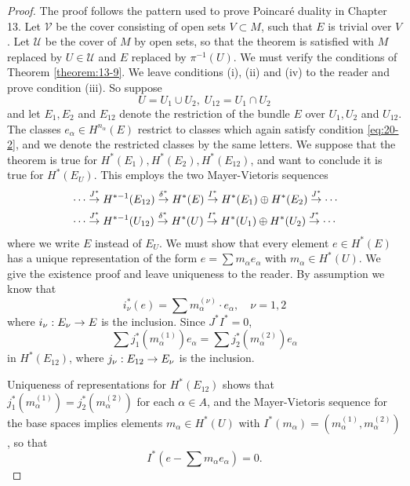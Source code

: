 \begin{proof}
  The proof follows the pattern used to prove Poincaré duality in Chapter 13. Let $\mathcal{V}$ be the cover 
  consisting of open sets $V \subset  M$, such that $E$ is trivial over $V$. Let $\mathcal{U}$ be the 
  cover of $M$ by open sets, so that the theorem is satisfied with $M$ replaced by $U \in  \mathcal{U}$ and $E$ 
  replaced by ${\pi }^{-1}( U)$. We must verify the conditions of Theorem \ref{theorem:13-9}. We leave conditions (i), (ii) 
  and (iv) to the reader and prove condition (iii). So suppose
  \[
    U = {U}_{1} \cup  {U}_{2},\;{U}_{12} = {U}_{1} \cap  {U}_{2}
  \]
  and let ${E}_{1},{E}_{2}$ and $E_{12}$ denote the restriction of the bundle $E$ over ${U}_{1},{U}_{2}$ 
  and ${U}_{12}$. The classes ${e}_{\alpha } \in  H^{{n}_{\alpha }}( E)$ restrict to classes which again 
  satisfy condition \eqref{eq:20-2}, and we denote the restricted classes by the same letters. We suppose that the theorem 
  is true for $H^*( {E}_{1}),H^*( {E}_{2}),H^*( E_{12})$, and want to conclude it is 
  true for $H^*( {E}_{U})$. This employs the two Mayer-Vietoris sequences
  \begin{align*}
    & \cdots \overset{{J}^*}
      { \rightarrow  }H^{*- 1}( E_{12}) \overset{{\delta }^*}
      { \rightarrow  }H^*( E) \overset{{I}^*}
      { \rightarrow  }H^*( {E}_{1})  \oplus  H^*( {E}_{2}) \overset{{J}^*}
      { \rightarrow  }\cdots\\
    & \cdots \overset{{J}^*}
      { \rightarrow  }H^{*- 1}( {U}_{12}) \overset{{\delta }^*}
      { \rightarrow  }H^*( U) \overset{{I}^*}
      { \rightarrow  }H^*( {U}_{1})  \oplus  H^*( {U}_{2}) \overset{{J}^*}
      { \rightarrow  }\cdots
  \end{align*}
  where we write $E$ instead of ${E}_{U}$. We must show that every element $e \in  H^*( E)$ has a unique 
  representation of the form $e = \sum {m}_{\alpha }{e}_{\alpha }$ with ${m}_{\alpha } \in  H^*( U)$. 
  We give the existence proof and leave uniqueness to the reader. By assumption we know that
  \[
    {i}_{\nu }^*( e)  = \sum {m}_{\alpha }^{( \nu ) } \cdot  {e}_{\alpha },\quad\nu  = 1,2
  \]
  where ${i}_{\nu } : {E}_{\nu } \rightarrow  E$ is the inclusion. Since ${J}^*{I}^* = 0$,
  \[
    \sum {j}_{1}^*( {m}_{\alpha }^{( 1) }) {e}_{\alpha } 
    = \sum {j}_{2}^*( {m}_{\alpha }^{( 2) }) {e}_{\alpha }
  \]
  in $H^*( E_{12})$, where ${j}_{\nu } : E_{12} \rightarrow  {E}_{\nu }$ is the inclusion.

  Uniqueness of representations for $H^*(E_{12})$ shows that ${j}_{1}^*( {m}_{\alpha }^{( 1) })= {j}_{2}^*( {m}_{\alpha }^{( 2) })$ 
  for each $\alpha  \in  A$, and the Mayer-Vietoris sequence for the base spaces implies elements ${m}_{\alpha } \in  H^*( U)$ 
  with ${I}^*( {m}_{\alpha })  = ( {{m}_{\alpha }^{( 1) },{m}_{\alpha }^{( 2) }})$, so that
  \[
    {I}^*( {e- \sum {m}_{\alpha }{e}_{\alpha }})  = 0.
  \]


\end{proof}
